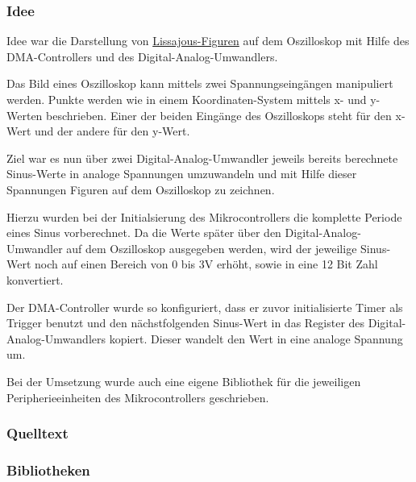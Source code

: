 \subsubsection*{Idee}

Idee war die Darstellung von \href{https://secure.wikimedia.org/wikipedia/de/wiki/Lissajous-Figuren}
{Lissajous-Figuren} auf dem Oszilloskop mit Hilfe des DMA-Controllers und  des Digital-Analog-Umwandlers.

Das Bild eines Oszilloskop kann mittels zwei Spannungseingängen manipuliert werden.
Punkte werden wie in einem Koordinaten-System mittels x- und y-Werten beschrieben.
Einer der beiden Eingänge des Oszilloskops steht für den x-Wert und der andere für den y-Wert.

Ziel war es nun über zwei Digital-Analog-Umwandler jeweils bereits berechnete Sinus-Werte in analoge Spannungen umzuwandeln und mit Hilfe dieser Spannungen Figuren auf dem Oszilloskop zu zeichnen. 

Hierzu wurden bei der Initialsierung des Mikrocontrollers die komplette Periode eines Sinus vorberechnet.
Da die Werte später über den Digital-Analog-Umwandler auf dem Oszilloskop ausgegeben werden,
wird der jeweilige Sinus-Wert noch auf einen Bereich von 0 bis 3V erhöht, sowie in eine 12 Bit Zahl konvertiert.

Der DMA-Controller wurde so konfiguriert, dass er zuvor initialisierte Timer als Trigger benutzt und den nächstfolgenden Sinus-Wert in das Register des Digital-Analog-Umwandlers kopiert. Dieser wandelt den Wert in eine analoge Spannung um.

Bei der Umsetzung wurde auch eine eigene Bibliothek für die jeweiligen Peripherieeinheiten des Mikrocontrollers geschrieben.

\subsubsection*{Quelltext}





\subsubsection*{Bibliotheken}







